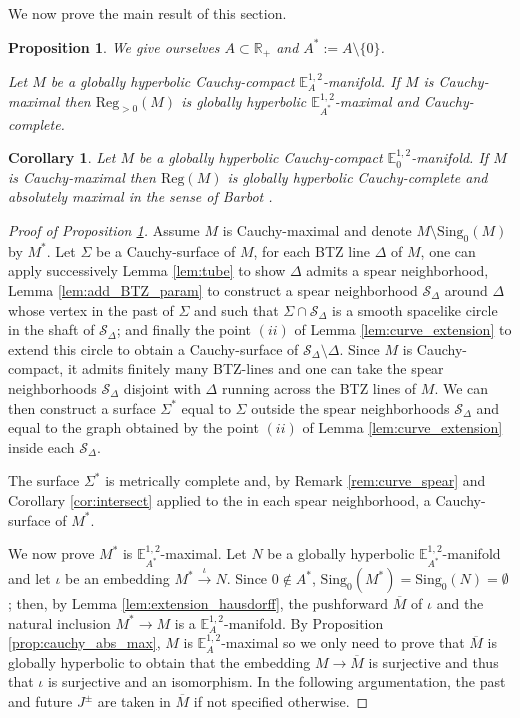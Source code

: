\documentclass[a4paper,12pt]{article}
\def\sing{\mathrm{Sing}}
\def\RR{\mathbb{R}}
\newcommand{\mass}[1]{{\mathbb E}^{1,2}_{#1}}
\def\Reg{\mathrm{Reg}}
\def\reg{\Reg}
\newtheorem{propou}[lemou]{Proposition}
\newtheorem{corou}[lemou]{Corollary}
\begin{document}
We now prove the main result of this section.
\begin{propou}\label{prop:abs_max} We give ourselves $A\subset \RR_+$ and $A^*:=A\setminus \{0\}$.

 Let $M$ be a globally hyperbolic Cauchy-compact $\mass{A}$-manifold. 
 If $M$ is Cauchy-maximal then $\reg_{>0}(M)$ is globally hyperbolic $\mass{A^*}$-maximal and Cau\-chy-complete.
\end{propou}
\begin{corou}\label{cor:abs_max}
 Let $M$ be a globally hyperbolic Cauchy-compact $\mass{0}$-mani\-fold. 
 If $M$ is Cauchy-maximal then $\Reg(M)$ is globally hyperbolic Cauchy-complete and absolutely maximal in the sense of Barbot \cite{barbot_globally_2004}.
\end{corou}
 
\begin{proof}[Proof of Proposition \ref{prop:abs_max}]
 Assume $M$ is Cauchy-maximal and denote $M\setminus \sing_0(M)$ by $M^*$.
 Let $\Sigma$ be a Cauchy-surface of $M$, for each BTZ line $\Delta$ of $M$, one can apply successively Lemma \ref{lem:tube} to show $\Delta$ admits a spear neighborhood, Lemma \ref{lem:add_BTZ_param} to construct a spear neighborhood $\mathcal S_\Delta$ around $\Delta$ whose vertex in the past of $\Sigma$ and such that $\Sigma\cap \mathcal S_\Delta$ is a  smooth spacelike circle in the shaft of $\mathcal S_\Delta$; and finally the point  $(ii)$ of Lemma \ref{lem:curve_extension} to extend this circle to obtain a Cauchy-surface of $\mathcal S_\Delta \setminus \Delta$.   
 Since $M$ is Cauchy-compact, it admits finitely many BTZ-lines and one can take the spear neighborhoods $\mathcal S_\Delta$ disjoint with $\Delta$ running across the BTZ lines of $M$. We can then construct a surface $\Sigma^*$ equal to $\Sigma$ outside the spear neighborhoods $\mathcal S_\Delta$ and equal to the graph obtained by the point $(ii)$ of Lemma \ref{lem:curve_extension} inside each $\mathcal S_\Delta$. 

  The surface $\Sigma^*$ is metrically complete and, by Remark \ref{rem:curve_spear} and Corollary \ref{cor:intersect} applied to the in each spear neighborhood, a Cauchy-surface of $M^*$. 

  We now prove $M^*$ is $\mass{A^*}$-maximal. Let $N$ be a globally hyperbolic $\mass{A^*}$-manifold and let $\iota$ be an embedding $M^*\xrightarrow{~\iota~} N$.  Since $0\notin A^*$, $\sing_0(M^*)=\sing_0(N)=\emptyset$; then, by Lemma \ref{lem:extension_hausdorff}, the pushforward $\overline M$ of $\iota$ and the natural inclusion $M^*\rightarrow M$ is a $\mass{A}$-manifold.  By Proposition \ref{prop:cauchy_abs_max}, $M$ is $\mass{A}$-maximal so  we only need to prove that $\overline M$ is globally hyperbolic to obtain that the embedding $M\rightarrow \overline M$ is surjective and thus that $\iota$ is surjective and an isomorphism. In the following argumentation, the past and future $J^\pm$ are taken in $\overline M$ if not specified otherwise.


\end{proof}
\end{document}
